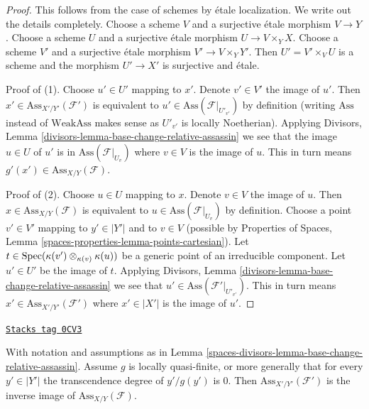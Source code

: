 \begin{proof}
This follows from the case of schemes by \'etale localization.
We write out the details completely. Choose a scheme
$V$ and a surjective \'etale morphism $V \to Y$.
Choose a scheme $U$ and a surjective
\'etale morphism $U \to V \times_Y X$. Choose a scheme $V'$
and a surjective \'etale morphism $V' \to V \times_Y Y'$.
Then $U' = V' \times_V U$ is a scheme and the morphism
$U' \to X'$ is surjective and \'etale.

\medskip\noindent
Proof of (1). Choose $u' \in U'$ mapping to $x'$.
Denote $v' \in V'$ the image of $u'$.
Then $x' \in \text{Ass}_{X'/Y'}(\mathcal{F}')$ is
equivalent to $u' \in \text{Ass}(\mathcal{F}|_{U'_{v'}})$
by definition (writing $\text{Ass}$ instead of $\text{WeakAss}$
makes sense as $U'_{v'}$ is locally Noetherian).
Applying Divisors, Lemma \ref{divisors-lemma-base-change-relative-assassin}
we see that the image $u \in U$ of $u'$ is in
$\text{Ass}(\mathcal{F}|_{U_v})$ where $v \in V$ is the image of $u$.
This in turn means $g'(x') \in \text{Ass}_{X/Y}(\mathcal{F})$.

\medskip\noindent
Proof of (2). Choose $u \in U$ mapping to $x$.
Denote $v \in V$ the image of $u$.
Then $x \in \text{Ass}_{X/Y}(\mathcal{F})$ is
equivalent to $u \in \text{Ass}(\mathcal{F}|_{U_v})$
by definition. Choose a point $v' \in V'$ mapping
to $y' \in |Y'|$ and to $v \in V$ (possible by
Properties of Spaces, Lemma \ref{spaces-properties-lemma-points-cartesian}).
Let $t \in \operatorname{Spec}(\kappa(v') \otimes_{\kappa(v)} \kappa(u))$
be a generic point of an irreducible component.
Let $u' \in U'$ be the image of $t$.
Applying Divisors, Lemma \ref{divisors-lemma-base-change-relative-assassin}
we see that $u' \in \text{Ass}(\mathcal{F}'|_{U'_{v'}})$.
This in turn means $x' \in \text{Ass}_{X'/Y'}(\mathcal{F}')$
where $x' \in |X'|$ is the image of $u'$.
\end{proof}

\begin{lemma}
\label{spaces-divisors-lemma-base-change-relative-assassin-quasi-finite}
\href{https://stacks.math.columbia.edu/tag/0CV3}{\texttt{Stacks tag 0CV3}}

With notation and assumptions as in
Lemma \ref{spaces-divisors-lemma-base-change-relative-assassin}.
Assume $g$ is locally quasi-finite, or more generally that
for every $y' \in |Y'|$ the transcendence degree of $y'/g(y')$ is $0$.
Then $\text{Ass}_{X'/Y'}(\mathcal{F}')$ is the inverse image of
$\text{Ass}_{X/Y}(\mathcal{F})$.
\end{lemma}

